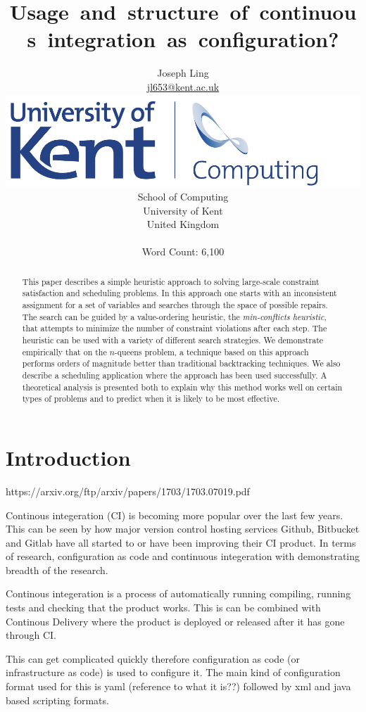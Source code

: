 \documentclass[twoside,12pt,titlepage,a4paper]{article}
\title{Usage and structure of continuous integration as configuration?}
\author{Joseph Ling\\\vspace{10mm}
       \url{jl653@kent.ac.uk} \\ \vspace{5mm}
       \includegraphics[scale=0.6]{Kent_Comp_294_RGB} \\
       School of Computing \\
       University of Kent \\
       United Kingdom \\ \vspace{10mm} \\ Word Count: 6,100}
\begin{document}
\maketitle
\restoregeometry              %

\begin{abstract}
This paper describes a simple heuristic approach to solving large-scale
constraint satisfaction and scheduling problems.  In this approach one
starts with an inconsistent assignment for a set of variables and
searches through the space of possible repairs. The search can be guided
by a value-ordering heuristic, the {\em min-conflicts heuristic}, that
attempts to minimize the number of constraint violations after each
step.  The heuristic can be used with a variety of different search
strategies.  We demonstrate empirically that on the $n$-queens problem, 
a technique
based on this approach performs orders of magnitude better than
traditional backtracking techniques.  We also describe a
scheduling application where the approach has been used successfully.  A
theoretical analysis is presented both to explain why this method works
well on certain types of problems and to predict when it is likely to
be most effective.
\end{abstract}

\section{Introduction}
\label{Introduction}

https://arxiv.org/ftp/arxiv/papers/1703/1703.07019.pdf

Continous integeration (CI) is becoming more popular over the last few years. This can be seen by how major version control hosting services Github, Bitbucket and Gitlab have all started to or have been improving their CI product. In terms of research, configuration as code \cite{Rahman2019} and continuous integeration \cite{Copeland2010} with \cite{Shahin2017} demonstrating breadth of the research.

Continous integeration is a process of automatically running compiling, running tests and checking that the product works. This is can be combined with Continous Delivery where the product is deployed or released after it has gone through CI. 

This can get complicated quickly therefore configuration as code (or infrastructure as code) is used to configure it. The main kind of configuration format used for this is yaml (reference to what it is??) followed by xml and java based scripting formats.
\end{document}
